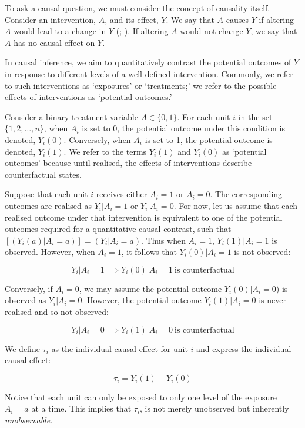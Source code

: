 \documentclass[
  single column]{article}
\begin{document}
To ask a causal question, we must consider the concept of causality
itself. Consider an intervention, \(A\), and its effect, \(Y\). We say
that \(A\) causes \(Y\) if altering \(A\) would lead to a change in
\(Y\) (;
). If altering \(A\) would not
change \(Y\), we say that \(A\) has no causal effect on \(Y\).

In causal inference, we aim to quantitatively contrast the potential
outcomes of \(Y\) in response to different levels of a well-defined
intervention. Commonly, we refer to such interventions as `exposures' or
`treatments;' we refer to the possible effects of interventions as
`potential outcomes.'

Consider a binary treatment variable \(A \in \{0,1\}\). For each unit
\(i\) in the set \(\{1, 2, \ldots, n\}\), when \(A_i\) is set to 0, the
potential outcome under this condition is denoted, \(Y_i(0)\).
Conversely, when \(A_i\) is set to 1, the potential outcome is denoted,
\(Y_i(1)\). We refer to the terms \(Y_i(1)\) and \(Y_i(0)\) as
`potential outcomes' because until realised, the effects of
interventions describe counterfactual states.

Suppose that each unit \(i\) receives either \(A_i = 1\) or \(A_i = 0\).
The corresponding outcomes are realised as \(Y_i|A_i = 1\) or
\(Y_i|A_i = 0\). For now, let us assume that each realised outcome under
that intervention is equivalent to one of the potential outcomes
required for a quantitative causal contrast, such that
\([(Y_i(a)|A_i = a)] = (Y_i|A_i = a)\). Thus when \(A_i = 1\),
\(Y_i(1)|A_i = 1\) is observed. However, when \(A_i = 1\), it follows
that \(Y_i(0)|A_i = 1\) is not observed:

\[
Y_i|A_i = 1 \implies Y_i(0)|A_i = 1~ \text{is counterfactual}
\]

Conversely, if \(A_i = 0\), we may assume the potential outcome
\(Y_i(0)|A_i = 0\)) is observed as \(Y_i|A_i = 0\). However, the
potential outcome \(Y_i(1)|A_i = 0\) is never realised and so not
observed:

\[
Y_i|A_i = 0 \implies Y_i(1)|A_i = 0~ \text{is counterfactual}
\]

We define \(\tau_i\) as the individual causal effect for unit \(i\) and
express the individual causal effect:

\[
\tau_i = Y_i(1) - Y_i(0)
\]

Notice that each unit can only be exposed to only one level of the
exposure \(A_i = a\) at a time. This implies that \(\tau_i\), is not
merely unobserved but inherently \emph{unobservable}.
\end{document}
